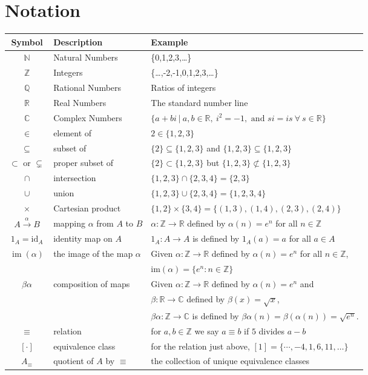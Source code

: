 \documentclass[12pt]{article}
\theoremstyle{definition}
\newcommand{\C}{\mathbb{C}}
\newcommand{\N}{\mathbb{N}}
\newcommand{\Q}{\mathbb{Q}}
\newcommand{\R}{\mathbb{R}}
\newcommand{\Z}{\mathbb{Z}}
\newcommand{\im}{\operatorname{im}}
\begin{document}
\section*{Notation}
\begin{tabular}{cll}
	\textbf{Symbol}&\textbf{Description}&\textbf{Example}\\\hline
	$\N$&Natural Numbers&\{0,1,2,3,\dots\}\\
	$\Z$&Integers&\{\dots,-2,-1,0,1,2,3,\dots\}\\
	$\Q$&Rational Numbers&Ratios of integers\\
	$\R$&Real Numbers&The standard number line\\
	$\C$&Complex Numbers&$\{a+bi\ |\ a,b\in\R,\ i^2=-1, \text{ and } si=is\ \forall\ s\in\R\}$\\
	$\in$&element of&  $2\in\{1,2,3\}$\\
	$\subseteq$&subset of & $\{2\}\subseteq\{1,2,3\}$ and $\{1,2,3\}\subseteq\{1,2,3\}$\\
	$\subset$ or $\subsetneq$&proper subset of &$\{2\}\subset\{1,2,3\}$ but $\{1,2,3\}\not\subset\{1,2,3\}$\\
	$\cap$& intersection&$\{1,2,3\}\cap\{2,3,4\}=\{2,3\}$\\
	$\cup$& union&$\{1,2,3\}\cup\{2,3,4\}=\{1,2,3,4\}$\\
	$\times$&Cartesian product&$\{1,2\}\times\{3,4\}=\{(1,3),(1,4),(2,3),(2,4)\}$\\
	$A\xrightarrow{\alpha}B$&mapping $\alpha$ from $A$ to $B$ & $\alpha:\Z\to\R$ defined by $\alpha(n)=e^n$ for all $n\in \Z$\\
	$1_A=\textrm{id}_A$&identity map on $A$& $1_A:A\to A$ is defined by $1_A(a)=a$ for all $a\in A$\\
	$\im(\alpha)$&the image of the map $\alpha$&Given $\alpha:\Z\to\R$ defined by $\alpha(n)=e^n$ for all $n\in \Z$,\\
	&&$\textrm{im}(\alpha)=\{e^n : n\in\Z\}$\\
	$\beta\alpha$&composition of maps& Given $\alpha:\Z\to \R$ defined by $\alpha(n)=e^n$ and\\&&  $\beta: \R\to \C$ defined by $\beta(x)= \sqrt{x}$,\\&&
	$\beta\alpha:\Z\to\C$ is defined by $\beta\alpha(n)=\beta(\alpha(n))=\sqrt{e^n}$.\\
	$\equiv$&relation&for $a,b\in\Z$ we say $a\equiv b$ if $5$ divides $a-b$\\
	$[\cdot]$&equivalence class& for the relation just above, $[1]=\{\cdots,-4,1,6,11,\dots\}$\\
	$A_\equiv$&quotient of $A$ by $\equiv$&the collection of unique equivalence classes
\end{tabular}
\end{document}
